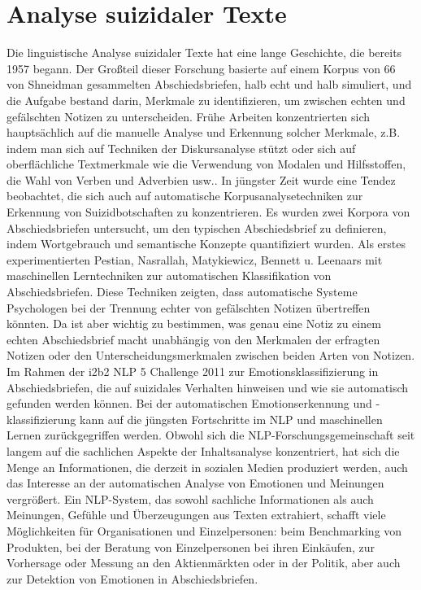 \documentclass[conference]{IEEEtran}
\begin{document}
\newpage
\section{Analyse suizidaler Texte}
Die linguistische Analyse suizidaler Texte hat eine lange Geschichte, die bereits 1957 begann. Der Großteil dieser Forschung basierte auf einem Korpus von 66 von Shneidman gesammelten Abschiedsbriefen, halb echt und halb simuliert, und die Aufgabe bestand darin, Merkmale zu identifizieren, um zwischen echten und gefälschten Notizen zu unterscheiden. Frühe Arbeiten konzentrierten sich hauptsächlich auf die manuelle Analyse und Erkennung solcher Merkmale, z.B. indem man sich auf Techniken der Diskursanalyse stützt oder sich auf oberflächliche Textmerkmale wie die Verwendung von Modalen und Hilfsstoffen, die Wahl von Verben und Adverbien usw.. In jüngster Zeit wurde eine Tendez beobachtet, die sich auch auf automatische Korpusanalysetechniken zur Erkennung von Suizidbotschaften zu konzentrieren. Es wurden zwei Korpora von Abschiedsbriefen untersucht, um den typischen Abschiedsbrief zu definieren, indem Wortgebrauch und semantische Konzepte quantifiziert wurden. Als erstes experimentierten Pestian, Nasrallah, Matykiewicz, Bennett u. Leenaars mit maschinellen Lerntechniken zur automatischen Klassifikation von Abschiedsbriefen. Diese Techniken zeigten, dass automatische Systeme Psychologen bei der Trennung echter von gefälschten Notizen übertreffen könnten. Da ist aber wichtig zu bestimmen, was genau eine Notiz zu einem echten Abschiedsbrief macht unabhängig von den Merkmalen der erfragten Notizen oder den Unterscheidungsmerkmalen zwischen beiden Arten von Notizen.
Im Rahmen der i2b2 NLP 5 Challenge 2011 zur Emotionsklassifizierung in Abschiedsbriefen, die auf suizidales Verhalten hinweisen und wie sie automatisch gefunden werden können. Bei der automatischen Emotionserkennung und -klassifizierung kann auf die jüngsten Fortschritte im NLP und maschinellen Lernen zurückgegriffen werden. Obwohl sich die NLP-Forschungsgemeinschaft seit langem auf die sachlichen Aspekte der Inhaltsanalyse konzentriert, hat sich die Menge an Informationen, die derzeit in sozialen Medien produziert werden, auch das Interesse an der automatischen Analyse von Emotionen und Meinungen vergrößert. 
Ein NLP-System, das sowohl sachliche Informationen als auch Meinungen, Gefühle und Überzeugungen aus Texten extrahiert, schafft viele Möglichkeiten für Organisationen und Einzelpersonen: beim Benchmarking von Produkten, bei der Beratung von Einzelpersonen bei ihren Einkäufen, zur Vorhersage oder Messung an den Aktienmärkten oder in der Politik, aber auch zur Detektion von Emotionen in Abschiedsbriefen.\cite{b4}
\end{document}
